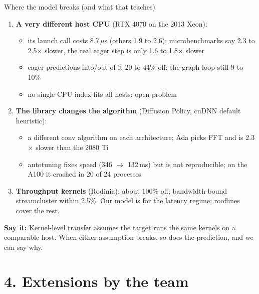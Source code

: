 \documentclass[aspectratio=169,10pt]{beamer}
\newcommand{\say}[1]{\par\vfill\noindent\colorbox{soft}{\parbox{\dimexpr\textwidth-2\fboxsep\relax}{\small\textbf{\textcolor{accent}{Say it:}} #1}}}
\begin{document}
\begin{frame}{Where the model breaks (and what that teaches)}
\begin{enumerate}
\item \textbf{A very different host CPU} (RTX 4070 on the 2013 Xeon):
  \begin{itemize}\small
  \item its launch call costs 8.7\,$\mu$s (others 1.9 to 2.6); microbenchmarks say 2.3 to
    2.5$\times$ slower, the real eager step is only 1.6 to 1.8$\times$ slower
  \item eager predictions into/out of it 20 to 44\% off; the graph loop still 9 to 10\%
  \item no single CPU index fits all hosts: open problem
  \end{itemize}
\item \textbf{The library changes the algorithm} (Diffusion Policy, cuDNN default heuristic):
  \begin{itemize}\small
  \item a different conv algorithm on each architecture; Ada picks FFT and is 2.3$\times$
    slower than the 2080 Ti
  \item autotuning fixes speed (346 $\rightarrow$ 132\,ms) but is not reproducible; on the A100
    it crashed in 20 of 24 processes
  \end{itemize}
\item \textbf{Throughput kernels} (Rodinia): about 100\% off; bandwidth-bound streamcluster
  within 2.5\%. Our model is for the latency regime; rooflines cover the rest.
\end{enumerate}
\say{Kernel-level transfer assumes the target runs the same kernels on a comparable host.
When either assumption breaks, so does the prediction, and we can say why.}
\end{frame}

\section{4. Extensions by the team}
\end{document}

